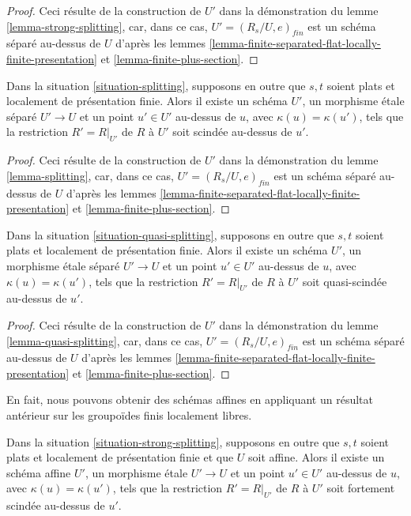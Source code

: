 \begin{proof}
Ceci résulte de la construction de $U'$ dans la démonstration du
lemme \ref{lemma-strong-splitting},
car, dans ce cas, $U' = (R_s/U, e)_{fin}$ est un schéma séparé au-dessus
de $U$ d'après les
lemmes \ref{lemma-finite-separated-flat-locally-finite-presentation} et
\ref{lemma-finite-plus-section}.
\end{proof}

\begin{lemma}
\label{lemma-splitting-scheme}
Dans la situation \ref{situation-splitting}, supposons en outre que
$s, t$ soient plats et localement de présentation finie.
Alors il existe un schéma $U'$, un morphisme \'etale séparé
$U' \to U$ et un point $u' \in U'$
au-dessus de $u$, avec $\kappa(u) = \kappa(u')$,
tels que la restriction $R' = R|_{U'}$ de $R$ à $U'$
soit scindée au-dessus de $u'$.
\end{lemma}

\begin{proof}
Ceci résulte de la construction de $U'$ dans la démonstration du
lemme \ref{lemma-splitting},
car, dans ce cas, $U' = (R_s/U, e)_{fin}$ est un schéma séparé au-dessus
de $U$ d'après les
lemmes \ref{lemma-finite-separated-flat-locally-finite-presentation} et
\ref{lemma-finite-plus-section}.
\end{proof}

\begin{lemma}
\label{lemma-quasi-splitting-scheme}
Dans la situation \ref{situation-quasi-splitting}, supposons en outre que
$s, t$ soient plats et localement de présentation finie.
Alors il existe un schéma $U'$, un morphisme \'etale séparé
$U' \to U$ et un point $u' \in U'$ au-dessus de $u$, avec
$\kappa(u) = \kappa(u')$, tels que la restriction $R' = R|_{U'}$ de
$R$ à $U'$ soit quasi-scindée au-dessus de $u'$.
\end{lemma}

\begin{proof}
Ceci résulte de la construction de $U'$ dans la démonstration du
lemme \ref{lemma-quasi-splitting},
car, dans ce cas, $U' = (R_s/U, e)_{fin}$ est un schéma séparé
au-dessus de $U$ d'après les
lemmes \ref{lemma-finite-separated-flat-locally-finite-presentation} et
\ref{lemma-finite-plus-section}.
\end{proof}

\noindent
En fait, nous pouvons obtenir des schémas affines en appliquant un résultat
antérieur sur les groupoïdes finis localement libres.

\begin{lemma}
\label{lemma-strong-splitting-affine-scheme}
Dans la situation \ref{situation-strong-splitting}, supposons en outre que
$s, t$ soient plats et localement de présentation finie et que $U$ soit affine.
Alors il existe un schéma affine $U'$, un morphisme \'etale
$U' \to U$ et un point $u' \in U'$ au-dessus de $u$, avec
$\kappa(u) = \kappa(u')$, tels que la restriction $R' = R|_{U'}$ de
$R$ à $U'$ soit fortement scindée au-dessus de $u'$.
\end{lemma}

